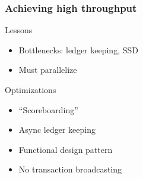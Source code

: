 \documentclass[aspectratio=169]{beamer}
\begin{document}
\begin{frame}
    \frametitle{Achieving high throughput}
    \begin{block}{Lessons}
        \begin{itemize}
            \item Bottlenecks: ledger keeping, SSD
            \item Must parallelize
        \end{itemize}
    \end{block}
        \pause
        \begin{block}{Optimizations}
            \begin{itemize}
                \item \alert<3>{``Scoreboarding''}
                \item \alert<3>{Async ledger keeping}
                \item Functional design pattern
                \item No transaction broadcasting
            \end{itemize}
        \end{block}
\end{frame}
\end{document}
